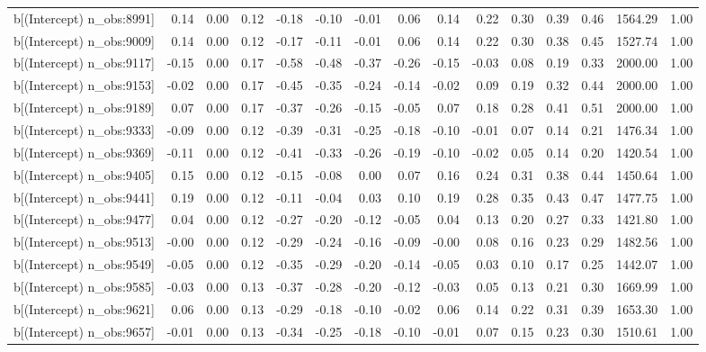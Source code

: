 \begin{table}[ht]
\begin{tabular}{rrrrrrrrrrrrrrr}
  b[(Intercept) n\_obs:8991] & 0.14 & 0.00 & 0.12 & -0.18 & -0.10 & -0.01 & 0.06 & 0.14 & 0.22 & 0.30 & 0.39 & 0.46 & 1564.29 & 1.00 \\ 
  b[(Intercept) n\_obs:9009] & 0.14 & 0.00 & 0.12 & -0.17 & -0.11 & -0.01 & 0.06 & 0.14 & 0.22 & 0.30 & 0.38 & 0.45 & 1527.74 & 1.00 \\ 
  b[(Intercept) n\_obs:9117] & -0.15 & 0.00 & 0.17 & -0.58 & -0.48 & -0.37 & -0.26 & -0.15 & -0.03 & 0.08 & 0.19 & 0.33 & 2000.00 & 1.00 \\ 
  b[(Intercept) n\_obs:9153] & -0.02 & 0.00 & 0.17 & -0.45 & -0.35 & -0.24 & -0.14 & -0.02 & 0.09 & 0.19 & 0.32 & 0.44 & 2000.00 & 1.00 \\ 
  b[(Intercept) n\_obs:9189] & 0.07 & 0.00 & 0.17 & -0.37 & -0.26 & -0.15 & -0.05 & 0.07 & 0.18 & 0.28 & 0.41 & 0.51 & 2000.00 & 1.00 \\ 
  b[(Intercept) n\_obs:9333] & -0.09 & 0.00 & 0.12 & -0.39 & -0.31 & -0.25 & -0.18 & -0.10 & -0.01 & 0.07 & 0.14 & 0.21 & 1476.34 & 1.00 \\ 
  b[(Intercept) n\_obs:9369] & -0.11 & 0.00 & 0.12 & -0.41 & -0.33 & -0.26 & -0.19 & -0.10 & -0.02 & 0.05 & 0.14 & 0.20 & 1420.54 & 1.00 \\ 
  b[(Intercept) n\_obs:9405] & 0.15 & 0.00 & 0.12 & -0.15 & -0.08 & 0.00 & 0.07 & 0.16 & 0.24 & 0.31 & 0.38 & 0.44 & 1450.64 & 1.00 \\ 
  b[(Intercept) n\_obs:9441] & 0.19 & 0.00 & 0.12 & -0.11 & -0.04 & 0.03 & 0.10 & 0.19 & 0.28 & 0.35 & 0.43 & 0.47 & 1477.75 & 1.00 \\ 
  b[(Intercept) n\_obs:9477] & 0.04 & 0.00 & 0.12 & -0.27 & -0.20 & -0.12 & -0.05 & 0.04 & 0.13 & 0.20 & 0.27 & 0.33 & 1421.80 & 1.00 \\ 
  b[(Intercept) n\_obs:9513] & -0.00 & 0.00 & 0.12 & -0.29 & -0.24 & -0.16 & -0.09 & -0.00 & 0.08 & 0.16 & 0.23 & 0.29 & 1482.56 & 1.00 \\ 
  b[(Intercept) n\_obs:9549] & -0.05 & 0.00 & 0.12 & -0.35 & -0.29 & -0.20 & -0.14 & -0.05 & 0.03 & 0.10 & 0.17 & 0.25 & 1442.07 & 1.00 \\ 
  b[(Intercept) n\_obs:9585] & -0.03 & 0.00 & 0.13 & -0.37 & -0.28 & -0.20 & -0.12 & -0.03 & 0.05 & 0.13 & 0.21 & 0.30 & 1669.99 & 1.00 \\ 
  b[(Intercept) n\_obs:9621] & 0.06 & 0.00 & 0.13 & -0.29 & -0.18 & -0.10 & -0.02 & 0.06 & 0.14 & 0.22 & 0.31 & 0.39 & 1653.30 & 1.00 \\ 
  b[(Intercept) n\_obs:9657] & -0.01 & 0.00 & 0.13 & -0.34 & -0.25 & -0.18 & -0.10 & -0.01 & 0.07 & 0.15 & 0.23 & 0.30 & 1510.61 & 1.00 \\ 

\end{tabular}
\end{table}
